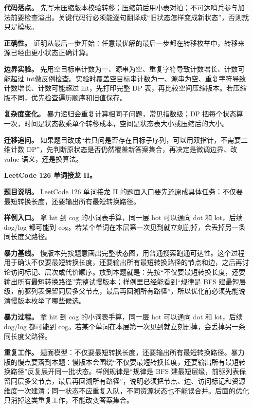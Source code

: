 \textbf{代码落点。} 先写未压缩版本校验转移；压缩前后用小表对拍；不可达哨兵参与加法前要检查溢出。关键代码行必须能逐句翻译成“旧状态怎样变成新状态”，否则就只是模板。

\textbf{正确性。} 证明从最后一步开始：任意最优解的最后一步都在转移枚举中，转移来源已经由更小状态正确计算。

\textbf{边界实验。} 先用空目标串计数为一、源串为空、重复字符导致计数增长、计数可能超过 int做反例检查。实验时覆盖空目标串计数为一、源串为空、重复字符导致计数增长、计数可能超过 int，先打印完整 DP 表，再比较空间压缩版本。若压缩版不同，优先检查遍历顺序和旧值保存。

\textbf{复杂度变化。} 暴力递归会重复计算相同子问题，常见指数级；DP 把每个状态算一次，时间是状态数乘单个转移成本，空间是状态表大小或压缩后的大小。

\textbf{迁移追问。} 如果题目改成“若只问是否存在目标子序列，可以用双指针，不需要二维计数 DP”，先判断原状态是否仍然覆盖新答案集合，再决定是微调边界、改 value 语义，还是换算法。

\noindent\textbf{LeetCode 126 单词接龙 II。}

\textbf{题目说明。} LeetCode 126 单词接龙 II 的题面入口要先还原成具体任务：不仅要最短转换长度，还要输出所有最短转换路径。

\textbf{样例入口。} 拿 hit 到 cog 的小词表手算，同一层 hot 可以通向 dot 和 lot，后续 dog/log 都可能到 cog。若某个单词在本层第一次见到就立刻删掉，会丢掉另一条同长度父路径。

\textbf{暴力基线。} 慢版本先按题意画出完整状态图，用普通搜索跑通可达性。这个过程用于确认不仅要最短转换长度，还要输出所有最短转换路径的节点和边，之后再讨论访问标记、层次或代价顺序。放到本题就是：先按“不仅要最短转换长度，还要输出所有最短转换路径”完整试慢版本；样例里已经能看到“规律是 BFS 建最短层级，前驱列表保留同层多父节点，最后再回溯所有路径”，所以优化前必须先能说清慢版本枚举了哪些候选。

\textbf{暴力过程。} 拿 hit 到 cog 的小词表手算，同一层 hot 可以通向 dot 和 lot，后续 dog/log 都可能到 cog。若某个单词在本层第一次见到就立刻删掉，会丢掉另一条同长度父路径。

\textbf{重复工作。} 题面模型：不仅要最短转换长度，还要输出所有最短转换路径。暴力版的慢点要落到本题：慢版本会围绕“不仅要最短转换长度，还要输出所有最短转换路径”反复展开同一批状态。样例规律是“规律是 BFS 建最短层级，前驱列表保留同层多父节点，最后再回溯所有路径”，说明必须把节点、边、访问标记和资源维度一次建清；同一状态不应重复入队，不同资源状态也不能误合并。后面的优化只消掉这类重复工作，不能改变答案集合。

